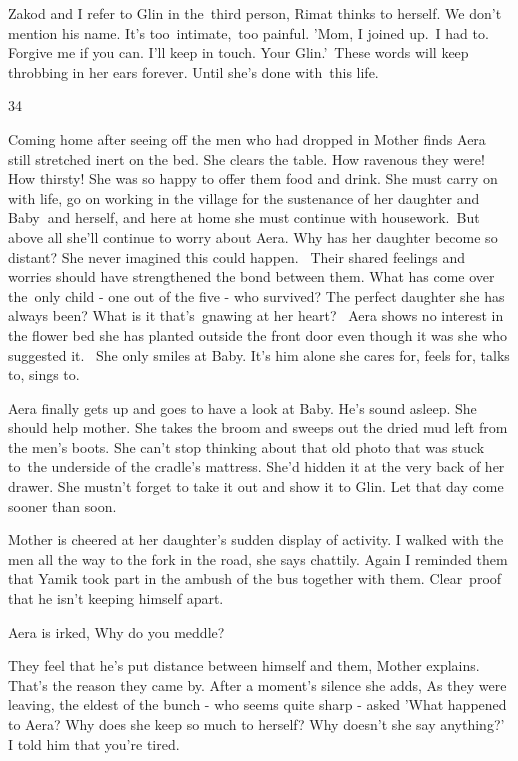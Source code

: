\documentclass[letterpaper]{article}
\begin{document}
Zakod and I refer to Glin in the\ third person, Rimat thinks to herself. We don't mention his name. It{}'s
too\ intimate,~too painful. {}'Mom, I joined up.\ I had to. Forgive me if you can. I{}'ll keep in touch. Your
Glin.{}'\ These words will keep throbbing in her ears forever. Until she{}'s done with\ this life.


\bigskip

34 \ 

Coming home after seeing off the men who had dropped in Mother finds Aera still stretched inert on the bed. She clears
the table. How ravenous they were! How thirsty! She was so happy to offer them food and drink. She must carry on with
life, go on working in the village for the sustenance of her daughter and Baby\textbf{\ }and herself, and here at home
she must continue with housework.\textcolor{red}{\ }But above all she'll continue to worry about Aera. Why has her
daughter become so distant? She never imagined this could happen. ~Their shared feelings and worries should have
strengthened the bond between them. What has come over the~only child - one out of the five - who survived? The perfect
daughter she has always been? What is it that's~gnawing at her heart? ~Aera shows no interest in the flower bed she has
planted outside the front door even though it was she who suggested it. ~She only smiles at Baby. It's him alone she
cares for, feels for, talks to, sings to.\ 

Aera finally gets up and goes to have a look at Baby. He's sound asleep. She should help mother. She takes the broom and
sweeps out the dried mud left from the men's boots. She can't stop thinking about that old photo that was stuck
to\textcolor{red}{\ }the underside of the cradle's mattress. She'd hidden it at the very back of her drawer. She
mustn't forget to take it out and show it to Glin. Let that day come sooner than soon. 

Mother is cheered at her daughter's sudden display of activity. {\textquotedbl}I walked with the men all the way to the
fork in the road,{\textquotedbl} she says chattily. {\textquotedbl}Again I reminded them that Yamik took part in the
ambush of the bus together with them.  Clear~proof that he isn't keeping himself apart.{\textquotedbl}

Aera is irked, {\textquotedbl}Why do you meddle?{\textquotedbl} 

{\textquotedbl}They feel that he{}'s put distance between himself and them,{\textquotedbl} Mother explains.
{\textquotedbl}That's the reason they came by.{\textquotedbl} After a moment's silence she adds, {\textquotedbl}As they
were leaving, the eldest of the bunch - who seems quite sharp - asked 'What happened to Aera? Why does she keep so much
to herself? Why doesn't she say anything?' I told him that you're tired.{\textquotedbl} 
\end{document}
